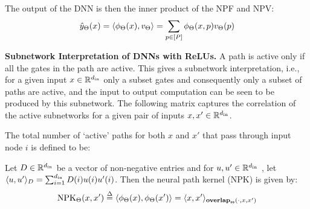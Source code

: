 \begin{proposition}\label{prop:npf-npv}
The output of the DNN is then the inner product of the NPF and NPV: 
\begin{align}\label{eq:inner}
\hat{y}_{\Theta}(x)=\langle \phi_{\Theta}(x),v_{\Theta}\rangle=\sum_{p\in[P]}  \phi_{\Theta}(x,p) v_{\Theta}(p)
\end{align}
\end{proposition}
\textbf{Subnetwork Interpretation of DNNs with ReLUs.} A path is active only if all the gates in the path are active. This gives a subnetwork interpretation, i.e., for a given input $x\in\mathbb{R}^{d_{\text{in}}}$ only a subset gates and consequently only a subset of paths are active, and the input to output computation can be seen to be produced by this subnetwork. The following matrix captures the correlation of the active subnetworks for a given pair of inputs $x,x'\in\mathbb{R}^{d_{\text{in}}}$.
\begin{definition}\label{def:overlap} 
The total number of `active' paths for both $x$ and $x'$ that pass through input node $i$ is defined to be:

{\par}
\end{definition}
\begin{lemma}\label{lm:npk}
Let $D\in\mathbb{R}^{d_{\text{in}}}$ be a vector of non-negative entries  and for $u,u'\in\mathbb{R}^{d_{\text{in}}}$ , let $\langle u,u'\rangle_{D}=\sum_{i=1}^{d_{\text{in}}}D(i)u(i)u'(i)$. Then the neural path kernel (NPK) is given by: 
\begin{align*} 
\text{NPK}_{\Theta}(x,x')\stackrel{\Delta}{=} \langle \phi_{\Theta}(x),\phi_{\Theta}(x')\rangle= \langle x,x'\rangle_{\textbf{overlap}_{\Theta}(\cdot,x,x')} 
\end{align*}
\end{lemma}




